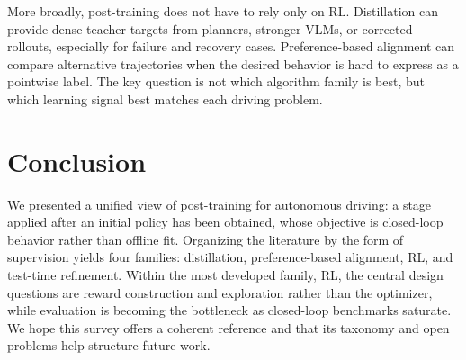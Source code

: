 \documentclass[runningheads]{llncs}
\begin{document}
More broadly, post-training does not have to rely only on RL. Distillation can provide dense teacher targets from planners, stronger VLMs, or corrected rollouts, especially for failure and recovery cases. Preference-based alignment can compare alternative trajectories when the desired behavior is hard to express as a pointwise label. The key question is not which algorithm family is best, but which learning signal best matches each driving problem.


\section{Conclusion}
\label{sec:conclusion}

We presented a unified view of post-training for autonomous driving: a stage applied after an initial policy has been obtained, whose objective is closed-loop behavior rather than offline fit. Organizing the literature by the form of supervision yields four families: distillation, preference-based alignment, RL, and test-time refinement. Within the most developed family, RL, the central design questions are reward construction and exploration rather than the optimizer, while evaluation is becoming the bottleneck as closed-loop benchmarks saturate. We hope this survey offers a coherent reference and that its taxonomy and open problems help structure future work.





\end{document}
